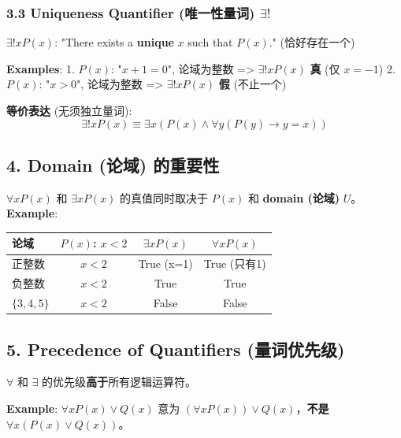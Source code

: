 \documentclass[10pt,a4paper,openany]{ctexbook}
\theoremstyle{definition}
\theoremstyle{remark}
\renewenvironment{quote}
  {\list{}{\leftmargin=1em\rightmargin=0pt\topsep=0.5pt\partopsep=0pt}\item[]}
  {\endlist}
\begin{document}
\subsubsection{3.3 Uniqueness Quantifier (唯一性量词) $\exists!$}

\begin{quote}
\textbf{$\exists! x P(x)$}: "There exists a \textbf{unique} $x$ such that $P(x)$." (恰好存在一个)

\textbf{Examples}:
1. $P(x)$: "$x + 1 = 0$", 论域为整数 => $\exists! x P(x)$ \textbf{真} (仅 $x=-1$)
2. $P(x)$: "$x > 0$", 论域为整数 => $\exists! x P(x)$ \textbf{假} (不止一个)

\textbf{等价表达} (无须独立量词):
\[
\exists! x P(x) \equiv \exists x (P(x) \land \forall y (P(y) \to y = x))
\]


\end{quote}
\vspace{-2pt}

\subsection{4. Domain (论域) 的重要性}

$\forall x P(x)$ 和 $\exists x P(x)$ 的真值同时取决于 $P(x)$ 和 \textbf{domain (论域)} $U$。
\textbf{Example}:
\begin{center}
\begin{tabular}{lccc}
\hline
论域 & $P(x)$: $x < 2$ & $\exists x P(x)$ & $\forall x P(x)$ \\ \hline
正整数 & $x<2$ & True (x=1) & True (只有1) \\
负整数 & $x<2$ & True & True \\
$\{3,4,5\}$ & $x<2$ & False & False \\
\hline
\end{tabular}

\end{center}

\vspace{-2pt}

\subsection{5. Precedence of Quantifiers (量词优先级)}

\begin{quote}
$\forall$ 和 $\exists$ 的优先级\textbf{高于}所有逻辑运算符。

\textbf{Example}: $\forall x P(x) \lor Q(x)$ 意为 $(\forall x P(x)) \lor Q(x)$，\textbf{不是} $\forall x (P(x) \lor Q(x))$。

\end{quote}
\vspace{-2pt}
\end{document}
